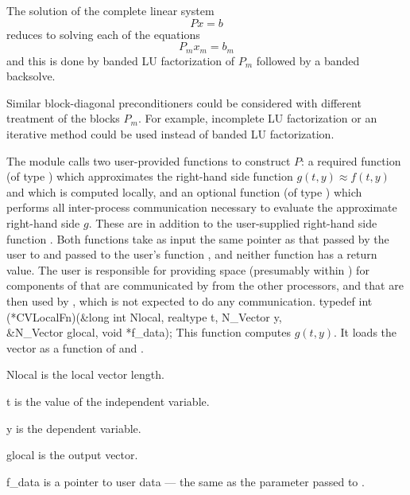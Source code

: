 The solution of the complete linear system
\begin{equation}
  Px = b
\end{equation}
reduces to solving each of the equations 
\begin{equation}
  P_m x_m = b_m
\end{equation}
and this is done by banded LU factorization of $P_m$ followed by a banded
backsolve.

Similar block-diagonal preconditioners could be considered with different
treatment of the blocks $P_m$. For example, incomplete LU factorization or
an iterative method could be used instead of banded LU factorization.

The {\cvbbdpre} module calls two user-provided functions to construct $P$: 
a required function  (of type ) which approximates
the right-hand side function $g(t,y) \approx f(t,y)$ and which is computed
locally, and an optional function  (of type ) which performs 
all inter-process communication necessary to evaluate the approximate right-hand
side $g$.  These are in addition to the user-supplied right-hand side function
.  Both functions take as input the same pointer  as that passed
by the user to  and passed to the user's function ,
and neither function has a return value. The user is responsible for
providing space (presumably within ) for components of 
that are communicated by  from the other processors, and that are
then used by , which is not expected to do any communication.
{
  typedef int (*CVLocalFn)(&long int Nlocal, realtype t, N\_Vector y, \\
                           &N\_Vector glocal, void *f\_data);
}
{
  This function computes $g(t,y)$. It loads the vector
   as a function of  and .  
}
{
  \begin{args}[Nlocal]
  \item[Nlocal] 
    is the local vector length.
  \item[t]
    is the value of the independent variable.
  \item[y]
    is the dependent variable. 
  \item[glocal]
    is the output vector.
  \item[f\_data]
    is a pointer to user data --- the same as the       
    parameter passed to .  
  \end{args}
}
